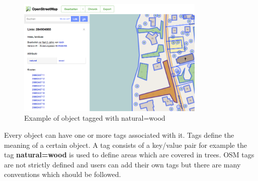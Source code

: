 \begin{figure}[H]
\centering
\includegraphics[width=0.8\textwidth]{images/osm_data_model}
\caption{Example of object tagged with natural=wood}
\end{figure}

Every object can have one or more tags associated with it. Tags define the meaning of a certain object. A tag consists of a key/value pair for example the tag \textbf{natural=wood} is used to define areas which are covered in trees. OSM tags are not strictly defined and users can add their own tags but there are many conventions which should be followed.